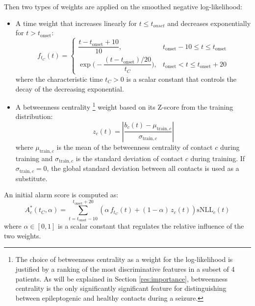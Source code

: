 Then two types of weights are applied on the smoothed negative log-likelihood:
\begin{itemize}
    \item A time weight that increases linearly for $t\leq t_{onset}$
    and decreases exponentially for $t > t_{\text{onset}}$:
    \begin{equation}
    f_{t_C}(t) =
    \begin{cases}
    \dfrac{t - t_{\text{onset}}+10}{10},
    & t_{\text{onset}}-10\leq t \leq t_{\text{onset}} \\[2mm]
    \exp\!\Big(-\dfrac{(t-t_{\text{onset}})/20}{t_C}\Big),
    & t_{\text{onset}} < t \leq t_{\text{onset}} + 20
    \end{cases}
    \end{equation}
    where the characteristic time $t_C>0$ is a scalar constant that controls the
    decay of the decreasing exponential.
    \item A betweenness centrality
    \footnote{The choice of betweenness centrality as a weight for the
    log-likelihood is justified by a ranking of the most discriminative
    features in a subset of 4 patients.
    As will be explained in Section \ref{res:importance}, betweenness centrality
    is the only significantly significant feature for distinguishing between
    epileptogenic and healthy contacts during a seizure.}
    weight based on its Z-score from the 
    training distribution:
    \begin{equation}
        z_c(t) = \left|\frac{b_c(t)-\mu_{\text{train},c}}
        {\sigma_{\text{train},c}}\right|
    \end{equation}
    where $\mu_{\text{train},c}$ is the mean of the betweenness centrality of
    contact $c$ during training and $\sigma_{\text{train},c}$ is the standard
    deviation of contact $c$ during training.
    If $\sigma_{\text{train},c}=0$, the global standard deviation between all
    contacts is used as a substitute.
\end{itemize}

An initial alarm score is computed as:
\begin{equation}
    A^*_c(t_C,\alpha) = \sum_{t = t_{\text{onset}} - 10}^{t_{\text{onset}} + 20} 
    \left( \alpha\, f_{t_C}(t) + (1-\alpha)\, z_c(t) \right) \text{sNLL}_c(t)
\end{equation}
where $\alpha\in[0,1]$ is a scalar constant that regulates the relative 
influence of the two weights.

